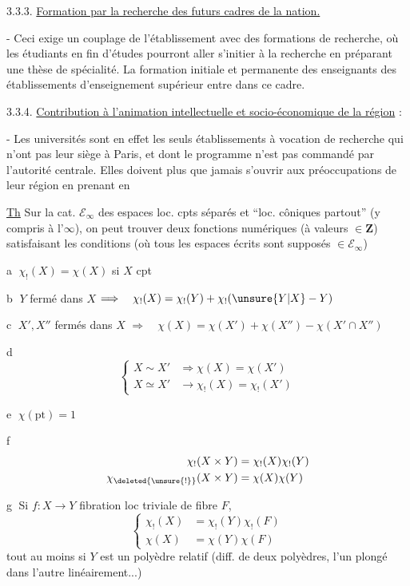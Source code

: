 3.3.3. \uline{Formation par la recherche des futurs cadres de la nation.}

- Ceci exige un couplage de l'établissement avec des formations de recherche, où les étudiants en fin d'études pourront aller s'initier à la recherche en préparant une thèse de spécialité. La formation initiale et permanente des enseignants des établissements d'enseignement supérieur entre dans ce cadre.

3.3.4. \uline{Contribution à l'animation intellectuelle et socio-économique de la région} :

- Les universités sont en effet les seuls établissements à vocation de recherche qui n'ont pas leur siège à Paris, et dont le programme n'est pas commandé par l'autorité centrale. Elles doivent plus que jamais s'ouvrir aux préoccupations de leur région en prenant en


\uline{Th} Sur la cat. $\mathcal E_\infty$ des espaces loc. cpts séparés et  ``loc. côniques partout'' (y compris à l'$\infty$), on peut trouver deux fonctions numériques \inserted{$\chi_!,\chi$} (à valeurs $\in\mathbf Z$) satisfaisant les conditions (où tous les espaces écrits sont supposés $\in\mathcal E_\infty$)

\textcircled{a} $\chi_!(X)=\chi(X)$ si $X$ cpt

\textcircled{b} $Y$ fermé dans $X$ $\Longrightarrow\quad\chi_!(X)=\chi_!(Y)+\chi_!(\unsure{Y|X}-Y)$

\textcircled{c} $X',X''$ fermés dans $X$ $\Longrightarrow\quad\chi(X)=\chi(X')+\chi(X'')-\chi(X'\cap X'')$

\textcircled{d}
\[
\left\{\begin{aligned}
X\sim X'&\Longrightarrow\chi(X)=\chi(X')\\
X\simeq X'&\longrightarrow\chi_!(X)=\chi_!(X')
\end{aligned}\right.
\]

\textcircled{e} $\chi(\mathrm{pt})=1$

\textcircled{f}
\[
\begin{aligned}
\chi_!(X\times Y)&=\chi_!(X)\chi_!(Y)\\
\chi_{\deleted{\unsure{!}}}(X\times Y)&=\chi(X)\chi(Y)
\end{aligned}
\]

\textcircled{g} Si $f:X\longrightarrow Y$ fibration loc triviale de fibre $F$,
\[
\left\{\begin{aligned}
\chi_!(X)&=\chi_!(Y)\chi_!(F)\\
\chi(X)&=\chi(Y)\chi(F)
\end{aligned}\right.
\]
tout au moins si $Y$ est un polyèdre relatif (diff. de deux polyèdres, l'un plongé dans l'autre linéairement...)

